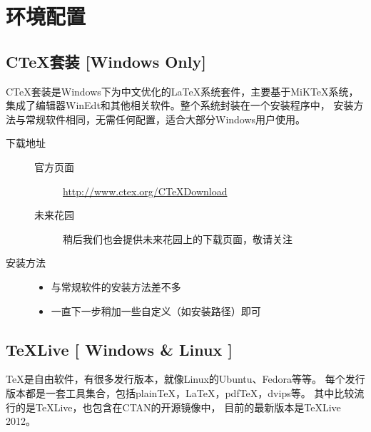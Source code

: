 ﻿%
\chapter{环境配置}

\section{C\TeX{}套装 [Windows Only]}

C\TeX{}套装是Windows下为中文优化的\LaTeX{}系统套件，主要基于MiKTeX系统，
集成了编辑器WinEdt和其他相关软件。整个系统封装在一个安装程序中，
安装方法与常规软件相同，无需任何配置，适合大部分Windows用户使用。

\begin{description}
    \item[下载地址] \hfill
    \begin{description}
        \item[官方页面]
            \url{http://www.ctex.org/CTeXDownload}
        \item[未来花园]
            稍后我们也会提供未来花园上的下载页面，敬请关注
    \end{description}
    \item[安装方法] \hfill
        \begin{itemize}
            \item[] 与常规软件的安装方法差不多
            \item[] 一直下一步稍加一些自定义（如安装路径）即可
        \end{itemize}
\end{description}

\section{\TeX{}Live [ Windows \& Linux ]}

\TeX{}是自由软件，有很多发行版本，就像Linux的Ubuntu、Fedora等等。
每个发行版本都是一套工具集合，包括plain\TeX{}，\LaTeX{}，pdf\TeX{}，dvips等。
其中比较流行的是\TeX{}Live，也包含在CTAN的开源镜像中，
目前的最新版本是\TeX{}Live 2012。

